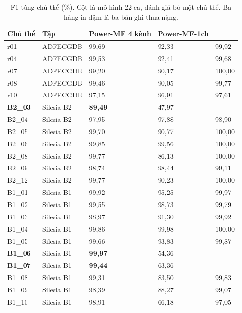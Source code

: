 \begin{table}[H]\centering\small
\caption{F1 từng chủ thể (\%). Cột \hethong{} là mô hình 22 ca, đánh giá bỏ-một-chủ-thể. Ba hàng in đậm
là ba bản ghi \hethong{} thua nặng.}
\label{tab:pmf_tungca}
\begin{tabular}{@{}L{2.0cm} L{2.6cm} C{2.9cm} C{2.9cm} C{2.9cm}@{}}
\toprule
\textbf{Chủ thể} & \textbf{Tập} & \textbf{Power-MF 4 kênh} & \textbf{Power-MF-1ch} &
\textbf{\hethong{}} \\
\midrule
r01 & ADFECGDB & 99,69 & 92,33 & 99,92 \\
r04 & ADFECGDB & 99,53 & 92,41 & 99,68 \\
r07 & ADFECGDB & 99,20 & 90,17 & 100,00 \\
r08 & ADFECGDB & 99,46 & 90,05 & 99,77 \\
r10 & ADFECGDB & 97,15 & 96,91 & 97,61 \\
\midrule
\textbf{B2\_03} & Silesia B2 & \textbf{89,49} & 47,97 &  \\
B2\_04 & Silesia B2 & 97,95 & 97,88 & 98,90 \\
B2\_05 & Silesia B2 & 99,70 & 90,77 & 100,00 \\
B2\_06 & Silesia B2 & 99,85 & 99,56 & 100,00 \\
B2\_08 & Silesia B2 & 99,77 & 86,13 & 100,00 \\
B2\_09 & Silesia B2 & 98,74 & 98,44 & 99,11 \\
B2\_12 & Silesia B2 & 99,77 & 90,23 & 100,00 \\
\midrule
B1\_01 & Silesia B1 & 99,92 & 95,25 & 99,97 \\
B1\_02 & Silesia B1 & 99,55 & 98,73 & 99,79 \\
B1\_03 & Silesia B1 & 98,97 & 91,30 & 99,92 \\
B1\_04 & Silesia B1 & 99,86 & 99,98 & 100,00 \\
B1\_05 & Silesia B1 & 99,66 & 93,83 & 99,87 \\
\textbf{B1\_06} & Silesia B1 & \textbf{99,97} & 54,36 &  \\
\textbf{B1\_07} & Silesia B1 & \textbf{99,44} & 63,36 &  \\
B1\_08 & Silesia B1 & 99,31 & 83,50 & 99,83 \\
B1\_09 & Silesia B1 & 98,39 & 88,27 & 99,07 \\
B1\_10 & Silesia B1 & 98,91 & 66,18 & 97,05 \\
\bottomrule
\end{tabular}
\end{table}

